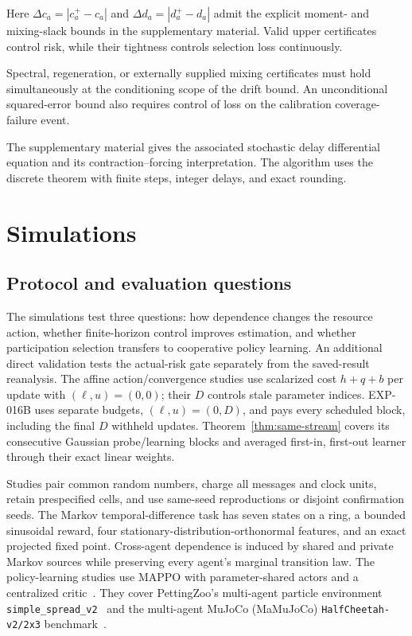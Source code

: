 \documentclass[journal]{IEEEtran}
\begin{document}
Here $\Delta c_a=|c_a^+-c_a|$ and $\Delta d_a=|d_a^+-d_a|$ admit the explicit moment- and mixing-slack bounds in the supplementary material.
Valid upper certificates control risk, while their tightness controls selection loss continuously.

Spectral, regeneration, or externally supplied mixing certificates must hold simultaneously at the conditioning scope of the drift bound.
An unconditional squared-error bound also requires control of loss on the calibration coverage-failure event.

The supplementary material gives the associated stochastic delay differential equation and its contraction--forcing interpretation.
The algorithm uses the discrete theorem with finite steps, integer delays, and exact rounding.

\section{Simulations}
\subsection{Protocol and evaluation questions}
The simulations test three questions: how dependence changes the resource action, whether finite-horizon control improves estimation, and whether participation selection transfers to cooperative policy learning.
An additional direct validation tests the actual-risk gate separately from the saved-result reanalysis.
The affine action/convergence studies use scalarized cost $h+q+b$ per update with $(\ell,u)=(0,0)$; their $D$ controls stale parameter indices.
EXP-016B uses separate budgets, $(\ell,u)=(0,D)$, and pays every scheduled block, including the final $D$ withheld updates.
Theorem~\ref{thm:same-stream} covers its consecutive Gaussian probe/learning blocks and averaged first-in, first-out learner through their exact linear weights.

Studies pair common random numbers, charge all messages and clock units, retain prespecified cells, and use same-seed reproductions or disjoint confirmation seeds.
The Markov temporal-difference task has seven states on a ring, a bounded sinusoidal reward, four stationary-distribution-orthonormal features, and an exact projected fixed point.
Cross-agent dependence is induced by shared and private Markov sources while preserving every agent's marginal transition law.
The policy-learning studies use MAPPO with parameter-shared actors and a centralized critic~\cite{yu2022mappo}.
They cover PettingZoo's multi-agent particle environment \texttt{simple\_spread\_v2}~\cite{terry2021pettingzoo} and the multi-agent MuJoCo (MaMuJoCo) \texttt{HalfCheetah-v2/2x3} benchmark~\cite{peng2021facmac}.
\end{document}
